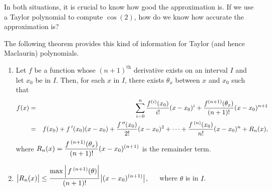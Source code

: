 In both situations, it is crucial to know how good the approximation is. If we use a Taylor polynomial to compute $\cos (2)$, how do we know how accurate the approximation is? 

 The following theorem provides this kind of information for Taylor (and hence Maclaurin) polynomials.

\begin{theorem}\label{thm:taylorthm}
\begin{enumerate}
\item	Let $f$ be a function whose $(n+1)^\text{th}$ derivative exists on an interval $I$ and let $x_0$ be in $I$. Then, for each $x$ in $I$, there exists $\theta_x$ between $x$ and $x_0$ such that
\begin{eqnarray*}
f(x) &=&\sum_{i=0}^n\dfrac{f^{(i)}(x_0)}{i!}(x-x_0)^i+\dfrac{f^{(n+1)}(\theta_x)}{(n+1)!}(x-x_0)^{n+1}\\
&=& f(x_0) + f\,'(x_0)(x-x_0) + \frac{f\,''(x_0)}{2!}(x-x_0)^2+ \cdots +\frac{f\,^{(n)}(x_0)}{n!}(x-x_0)^n+R_n(x),
\end{eqnarray*}
where $\displaystyle R_n(x) = \frac{f\,^{(n+1)}(\theta_x)}{(n+1)!}(x-x_0)^{(n+1)}$ is the remainder term.

\item		$\displaystyle \big|R_n(x)\big| \leq \frac{\max\left|\,f\,^{(n+1)}(\theta)\right|}{(n+1)!}\big|(x-x_0)^{(n+1)}\big|$, $ \quad$ where $\theta$ is in $I$.
\end{enumerate}
\end{theorem}

\ifanalysis

